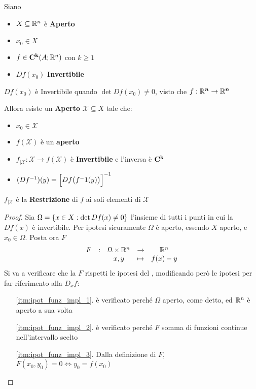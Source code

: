 \begin{theorem}
	\label{teo:funz_inv}
	Siano
	\begin{itemize}[noitemsep]
		\item $X \subseteq \mathbb{R}^n$ è \textbf{Aperto}
		\item $x_0 \in X$
		\item $f \in \mathbf{C^{k}}(A;\mathbb{R}^n)$ con $k \geq 1$
		\item $Df(x_0)$ \textbf{Invertibile}
	\end{itemize}
	\begin{note}
		$Df(x_0)$ è Invertibile quando $\det Df(x_0) \neq 0$, visto che $f: \mathbb{R}^{\boldsymbol{n}} \to \mathbb{R}^{\boldsymbol{n}}$
	\end{note}
	Allora esiste un \textbf{Aperto} $\mathcal{X} \subseteq X$ tale che:
	\begin{itemize}[noitemsep]
		\item $x_0 \in \mathcal{X}$
		\item $f(\mathcal{X})$ è un \textbf{aperto}
		\item $f_{|\mathcal{X}}: \mathcal{X} \to f(\mathcal{X})$ è \textbf{Invertibile} e l'inversa è $\mathbf{C^{k}}$
		\item $(Df^{-1})(y) = \Bigl[Df\bigl( f^-1(y) \bigr)\Bigr]^{-1}$
	\end{itemize}
	\begin{note}
		$f_{|\mathcal{X}}$ è la \textbf{Restrizione} di $f$ ai soli elementi di $\mathcal{X}$
	\end{note}
	\begin{proof}
		Sia $\Omega = \left\{x \in X: \det Df(x) \neq 0\right\}$ l'insieme di tutti i punti in cui la $Df(x)$ è invertibile. Per ipotesi sicuramente $\Omega$ è aperto, essendo $X$ aperto, e $x_0 \in \Omega$.
		Posta ora $F$
		\[\begin{array}{ccccc} {F} & : & {\Omega \times \mathbb{R}^n} & \to & {\mathbb{R}^n} \\ & & {x, y} & \mapsto & {f(x) - y} \\ \end{array}\]
		Si va a verificare che la $F$ rispetti le ipotesi del , modificando però le ipotesi per far riferimento alla $D_xf$:
		\begin{enumerate}[noitemsep]
			\item[\ref{itm:ipot_funz_impl_1}.] è verificato perché $\Omega$ aperto, come detto, ed $\mathbb{R}^n$ è aperto a sua volta
			\item[\ref{itm:ipot_funz_impl_2}.] è verificato perché $F$ somma di funzioni continue nell'intervallo scelto
			\item[\ref{itm:ipot_funz_impl_3}.] Dalla definizione di $F$, $F(x_0, y_0) = 0 \iff y_0 = f(x_0)$

\end{enumerate}
\end{proof}
\end{theorem}
